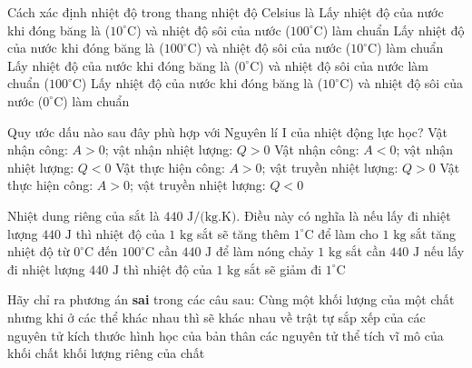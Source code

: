 \begin{ex}%
	Cách xác định nhiệt độ trong thang nhiệt độ Celsius là
	\choice
	{Lấy nhiệt độ của nước khi đóng băng là ($10^\circ\text{C}$) và nhiệt độ sôi của nước ($100^\circ\text{C}$) làm chuẩn}
	{Lấy nhiệt độ của nước khi đóng băng là ($100^\circ\text{C}$) và nhiệt độ sôi của nước ($10^\circ\text{C}$) làm chuẩn}
	{\True Lấy nhiệt độ của nước khi đóng băng là ($0^\circ\text{C}$) và nhiệt độ sôi của nước làm chuẩn ($100^\circ\text{C}$)}
	{Lấy nhiệt độ của nước khi đóng băng là ($10^\circ\text{C}$) và nhiệt độ sôi của nước ($0^\circ\text{C}$) làm chuẩn}
\end{ex}

\begin{ex}%
	Quy ước dấu nào sau đây phù hợp với Nguyên lí I của nhiệt động lực học?
	\choice
	{\True Vật nhận công: $A>0$; vật nhận nhiệt lượng: $Q>0$}
	{Vật nhận công: $A<0$; vật nhận nhiệt lượng: $Q<0$}
	{Vật thực hiện công: $A>0$; vật truyền nhiệt lượng: $Q>0$}
	{Vật thực hiện công: $A>0$; vật truyền nhiệt lượng: $Q<0$}
\end{ex}

\begin{ex}%
	Nhiệt dung riêng của sắt là $440\text{ J/(kg.K)}$. Điều này có nghĩa là
	\choice
	{nếu lấy đi nhiệt lượng $440\text{ J}$ thì nhiệt độ của $1\text{ kg}$ sắt sẽ tăng thêm $1^\circ\text{C}$}
	{để làm cho $1\text{ kg}$ sắt tăng nhiệt độ từ $0^\circ\text{C}$ đến $100^\circ\text{C}$ cần $440\text{ J}$}
	{để làm nóng chảy $1\text{ kg}$ sắt cần $440\text{ J}$}
	{\True nếu lấy đi nhiệt lượng $440\text{ J}$ thì nhiệt độ của $1\text{ kg}$ sắt sẽ giảm đi $1^\circ\text{C}$}
\end{ex}

\begin{ex}%
	Hãy chỉ ra phương án \textbf{sai} trong các câu sau: Cùng một khối lượng của một chất nhưng khi ở các thể khác nhau thì sẽ khác nhau về
	\choice
	{trật tự sắp xếp của các nguyên tử}
	{\True kích thước hình học của bản thân các nguyên tử}
	{thể tích vĩ mô của khối chất}
	{khối lượng riêng của chất}
\end{ex}

